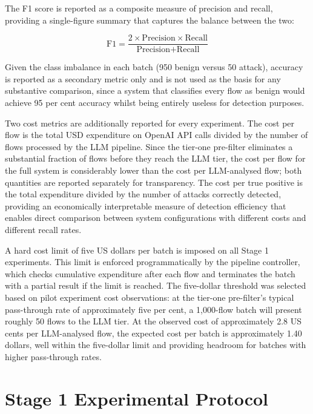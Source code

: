 The F1 score is reported as a composite measure of precision and recall, providing a single-figure summary that captures the balance between the two:

\begin{equation}
\text{F1} = \frac{2 \times \text{Precision} \times \text{Recall}}{\text{Precision} + \text{Recall}}
\label{eq:f1}
\end{equation}

\noindent Given the class imbalance in each batch (950 benign versus 50 attack), accuracy is reported as a secondary metric only and is not used as the basis for any substantive comparison, since a system that classifies every flow as benign would achieve 95 per cent accuracy whilst being entirely useless for detection purposes.

Two cost metrics are additionally reported for every experiment. The cost per flow is the total USD expenditure on OpenAI API calls divided by the number of flows processed by the LLM pipeline. Since the tier-one pre-filter eliminates a substantial fraction of flows before they reach the LLM tier, the cost per flow for the full system is considerably lower than the cost per LLM-analysed flow; both quantities are reported separately for transparency. The cost per true positive is the total expenditure divided by the number of attacks correctly detected, providing an economically interpretable measure of detection efficiency that enables direct comparison between system configurations with different costs and different recall rates.

A hard cost limit of five US dollars per batch is imposed on all Stage 1 experiments. This limit is enforced programmatically by the pipeline controller, which checks cumulative expenditure after each flow and terminates the batch with a partial result if the limit is reached. The five-dollar threshold was selected based on pilot experiment cost observations: at the tier-one pre-filter's typical pass-through rate of approximately five per cent, a 1,000-flow batch will present roughly 50 flows to the LLM tier. At the observed cost of approximately 2.8 US cents per LLM-analysed flow, the expected cost per batch is approximately 1.40 dollars, well within the five-dollar limit and providing headroom for batches with higher pass-through rates.

\section{Stage 1 Experimental Protocol}
\label{sec:stage1-protocol}

